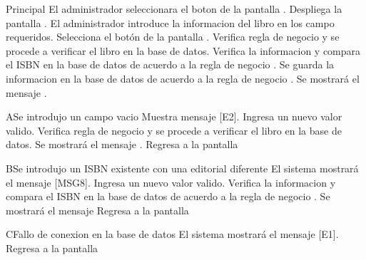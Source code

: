 \begin{UCtrayectoria}{Principal}
	\UCpaso[\UCactor] El administrador seleccionara el boton  de la pantalla .
	\UCpaso[\UCsist] Despliega la pantalla .
	\UCpaso[\UCactor] El administrador introduce la informacion del libro en los campo requeridos.
	\UCpaso[\UCactor] Selecciona el botón  de la pantalla .
	\UCpaso[\UCsist] Verifica regla de negocio  y se procede a verificar el libro en la base de datos.
	\UCpaso[\UCsist] Verifica la informacion y compara el ISBN en la base de datos de acuerdo a la regla de negocio  .
	\UCpaso[\UCsist] Se guarda la informacion en la base de datos de acuerdo a la regla de negocio  .
	\UCpaso[\UCsist] Se mostrará el mensaje .
\end{UCtrayectoria}
\begin{UCtrayectoriaA}{A}{Se introdujo un campo vacio}	
			\UCpaso[\UCsist] Muestra mensaje [E2].
			\UCpaso[\UCactor] Ingresa un nuevo valor valido.
			\UCpaso[\UCsist] Verifica regla de negocio  y se procede a verificar el libro en la base de datos.
			\UCpaso[\UCsist] Se mostrará el mensaje .
			\UCpaso[\UCsist] Regresa a la pantalla 			
\end{UCtrayectoriaA}
\begin{UCtrayectoriaA}{B}{Se introdujo un ISBN existente con una editorial diferente}	
			\UCpaso[\UCsist] El sistema mostrará el mensaje [MSG8].
			\UCpaso[\UCactor] Ingresa un nuevo valor valido.
			\UCpaso[\UCsist] Verifica la informacion y compara el ISBN en la base de datos de acuerdo a la regla de negocio  .
			\UCpaso[\UCsist] Se mostrará el mensaje 
			\UCpaso[\UCsist] Regresa a la pantalla 	
\end{UCtrayectoriaA}
\begin{UCtrayectoriaA}{C}{Fallo de conexion en la base de datos}
			\UCpaso[\UCsist] El sistema mostrará el mensaje [E1].
			\UCpaso[\UCsist] Regresa a la pantalla 	
\end{UCtrayectoriaA}

